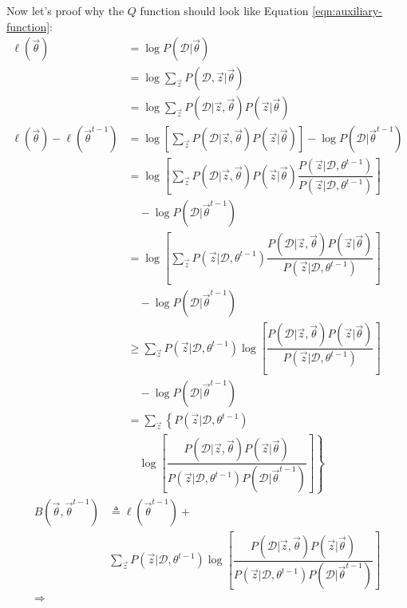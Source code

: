 Now let's proof why the $Q$ function should look like Equation \ref{eqn:auxiliary-function}:
\begin{align}
\ell(\vec{\theta}) &= \log{P(\mathcal{D}|\vec{\theta})}  \nonumber \\
                &= \log{{\sum\limits_{\vec{z}} P(\mathcal{D},\vec{z}|\vec{\theta})}} \nonumber \\
				&= \log{{\sum\limits_{\vec{z}} P(\mathcal{D}|\vec{z},\vec{\theta})P(\vec{z}|\vec{\theta})}} \nonumber \\
\ell(\vec{\theta})-\ell(\vec{\theta}^{t-1}) &= \log\left[\sum\limits_{\vec{z}} P(\mathcal{D}|\vec{z},\vec{\theta})P(\vec{z}|\vec{\theta})\right] - \log{P(\mathcal{D}|\vec{\theta}^{t-1})} \nonumber \\
                &= \log\left[\sum\limits_{\vec{z}} P(\mathcal{D}|\vec{z},\vec{\theta})P(\vec{z}|\vec{\theta})\dfrac{P(\vec{z}|\mathcal{D},\theta^{t-1})}{P(\vec{z}|\mathcal{D},\theta^{t-1})}\right] \nonumber \\
				& \quad -\log{P(\mathcal{D}|\vec{\theta}^{t-1})} \nonumber \\
				&= \log\left[\sum\limits_{\vec{z}} P(\vec{z}|\mathcal{D},\theta^{t-1})\dfrac{P(\mathcal{D}|\vec{z},\vec{\theta})P(\vec{z}|\vec{\theta})}{P(\vec{z}|\mathcal{D},\theta^{t-1})}\right] \nonumber \\
				& \quad - \log{P(\mathcal{D}|\vec{\theta}^{t-1})} \nonumber \\
				&\geq \sum\limits_{\vec{z}} P(\vec{z}|\mathcal{D},\theta^{t-1})\log\left[\dfrac{P(\mathcal{D}|\vec{z},\vec{\theta})P(\vec{z}|\vec{\theta})}{P(\vec{z}|\mathcal{D},\theta^{t-1})}\right] \nonumber \\
				& \quad - \log{P(\mathcal{D}|\vec{\theta}^{t-1})} \nonumber \\
				&= \sum\limits_{\vec{z}} \left\{P(\vec{z}|\mathcal{D},\theta^{t-1}) \right. \nonumber \\
				& \quad \left. \log\left[\dfrac{P(\mathcal{D}|\vec{z},\vec{\theta})P(\vec{z}|\vec{\theta})}{P(\vec{z}|\mathcal{D},\theta^{t-1})P(\mathcal{D}|\vec{\theta}^{t-1})}\right]\right\} \nonumber
\end{align}
\begin{align}
B(\vec{\theta},\vec{\theta}^{t-1}) & \triangleq \ell(\vec{\theta}^{t-1})+ \nonumber \\
 & \sum\limits_{\vec{z}} P(\vec{z}|\mathcal{D},\theta^{t-1})\log\left[\dfrac{P(\mathcal{D}|\vec{z},\vec{\theta})P(\vec{z}|\vec{\theta})}{P(\vec{z}|\mathcal{D},\theta^{t-1})P(\mathcal{D}|\vec{\theta}^{t-1})}\right] \nonumber \\
\Rightarrow & \nonumber
\end{align}

